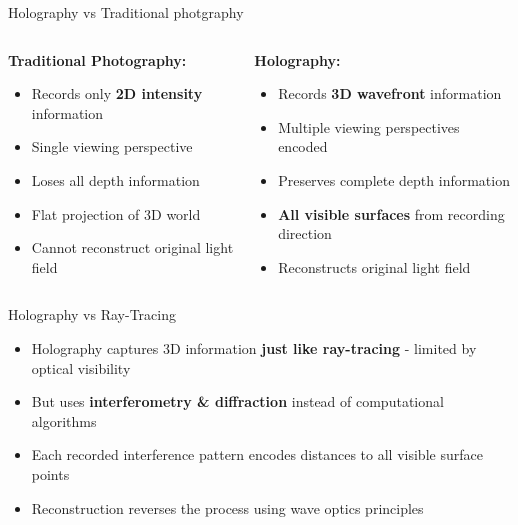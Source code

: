 \documentclass{beamer}
\begin{document}
\begin{frame}{Holography vs Traditional photgraphy}
    \begin{columns}[T]
        \begin{column}{0.48\textwidth}
            \textbf{Traditional Photography:}
            \begin{itemize}
                \item Records only \textbf{2D intensity} information
                \item Single viewing perspective
                \item Loses all depth information
                \item Flat projection of 3D world
                \item Cannot reconstruct original light field
            \end{itemize}
        \end{column}
        \begin{column}{0.48\textwidth}
            \textbf{Holography:}
            \begin{itemize}
                \item Records \textbf{3D wavefront} information
                \item Multiple viewing perspectives encoded
                \item Preserves complete depth information
                \item \textbf{All visible surfaces} from recording direction
                \item Reconstructs original light field
            \end{itemize}
        \end{column}
    \end{columns}
\end{frame}
\begin{frame}{Holography vs Ray-Tracing}
    \begin{itemize}
        \item Holography captures 3D information \textbf{just like ray-tracing} - limited by optical visibility
        \item But uses \textbf{interferometry \& diffraction} instead of computational algorithms
        \item Each recorded interference pattern encodes distances to all visible surface points
        \item Reconstruction reverses the process using wave optics principles
    \end{itemize}
\end{frame}
\end{document}
